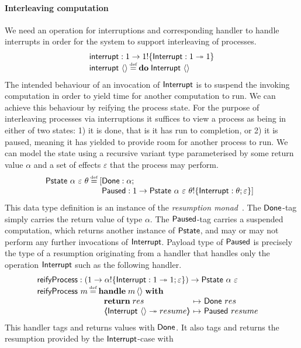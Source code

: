 \documentclass[12pt,phd,lfcs,twoside,openright,logo,leftchapter,normalheadings]{infthesis}
\theoremstyle{plain}
\theoremstyle{definition}
\begin{document}
\paragraph{Interleaving computation}
%
We need an operation for interruptions and corresponding handler to
handle interrupts in order for the system to support interleaving of
processes.
%
\[
  \bl
    \interrupt : \UnitType \to \UnitType \eff \{\Interrupt : \UnitType \opto \UnitType\}\\
    \interrupt~\Unit \defas \Do\;\Interrupt~\Unit
  \el
\]
%
The intended behaviour of an invocation of $\mathsf{Interrupt}$ is to suspend
the invoking computation in order to yield time for another
computation to run.
%
We can achieve this behaviour by reifying the process state. For the
purpose of interleaving processes via interruptions it suffices to
view a process as being in either of two states: 1) it is done, that
is it has run to completion, or 2) it is paused, meaning it has
yielded to provide room for another process to run.
%
We can model the state using a recursive variant type parameterised by
some return value $\alpha$ and a set of effects $\varepsilon$ that the
process may perform.
%
\[
  \Pstate~\alpha~\varepsilon~\theta \defas
    \ba[t]{@{}l@{}l}
       [&\Done:\alpha;\\
        &\Suspended:\UnitType \to \Pstate~\alpha~\varepsilon~\theta \eff \{\Interrupt:\theta;\varepsilon\} ]
     \ea
\]
%
This data type definition is an instance of the \emph{resumption
  monad}~\cite{Papaspyrou01}. The $\mathsf{Done}$-tag simply carries the
return value of type $\alpha$. The $\mathsf{Paused}$-tag carries a
suspended computation, which returns another instance of $\mathsf{Pstate}$,
and may or may not perform any further invocations of
$\mathsf{Interrupt}$. Payload type of $\mathsf{Paused}$ is precisely the type of a
resumption originating from a handler that handles only the operation
$\mathsf{Interrupt}$ such as the following handler.
%
\[
  \bl
    \reifyP : (\UnitType \to \alpha \eff \{\Interrupt: \UnitType \opto \UnitType;\varepsilon\}) \to \Pstate~\alpha~\varepsilon\\
    \reifyP~m \defas
         \ba[t]{@{}l}
           \Handle\;m\,\Unit\;\With\\
             ~\ba{@{~}l@{~}c@{~}l}
                \Return\;res &\mapsto& \Done~res\\
                \OpCase{\Interrupt}{\Unit}{resume} &\mapsto& \Suspended~resume
              \ea
         \ea
  \el
\]
%
This handler tags and returns values with $\mathsf{Done}$. It also tags and
returns the resumption provided by the $\mathsf{Interrupt}$-case with
\end{document}
